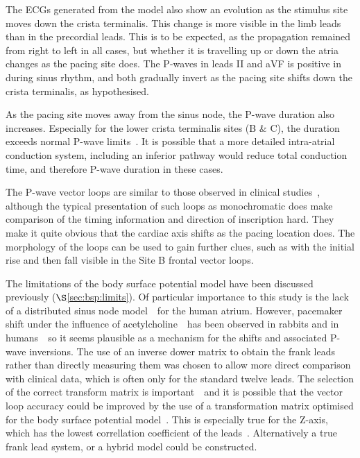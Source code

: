 The ECGs generated from the model also show an evolution as the stimulus site
moves down the crista terminalis.
This change is more visible in the limb leads than in the precordial leads.
This is to be expected, as the propagation remained from right to left in all
cases, but whether it is travelling up or down the atria changes as the pacing
site does.
The P-waves in leads II and aVF is positive in during sinus rhythm, and both
gradually invert as the pacing site shifts down the crista terminalis, as
hypothesised.

As the pacing site moves away from the sinus node, the P-wave duration also
increases.
Especially for the lower crista terminalis sites (B \& C), the duration exceeds
normal P-wave limits~\cite{Lemery2004,MacFarlane1989}.
It is possible that a more detailed intra-atrial conduction system, including an
inferior pathway would reduce total conduction time, and therefore P-wave
duration in these cases.

The P-wave vector loops are similar to those observed in clinical
studies~\cite{Carlson2005,Holmqvist2007,Havmoller2007,Guillem2008}, although the typical
presentation of such loops as monochromatic does make comparison of the timing
information and direction of inscription hard.
They make it quite obvious that the cardiac axis shifts as the pacing location
does.
The morphology of the loops can be used to gain further clues, such as with the
initial rise and then fall visible in the Site B frontal vector loops.

The limitations of the body surface potential model have been discussed
previously ($\S$\ref{sec:bsp:limits}).
Of particular importance to this study is the lack of a distributed sinus node
model~\cite{Yamamoto2007,Dobrzynski2005}\ for the human atrium.
However, pacemaker shift under the influence of
acetylcholine~\cite{Shibata2001}\ has been observed in rabbits and in
humans~\cite{Opthof1988}\ so it seems plausible as a mechanism for the shifts
and associated P-wave inversions.
The use of an inverse dower matrix to obtain the frank leads rather than
directly measuring them was chosen to allow more direct comparison with clinical
data, which is often only for the standard twelve leads.
The selection of the correct transform matrix is
important~\cite{Guillem2008,Luo1991b,Hyttinen1995}\ and it is possible that the
vector loop accuracy could be improved by the use of a transformation matrix
optimised for the body surface potential model~\cite{vanOosterom2007}.
This is especially true for the Z-axis, which has the lowest correllation
coefficient of the leads~\cite{Hyttinen1995}.
Alternatively a true frank lead system, or a hybrid model could be constructed.

